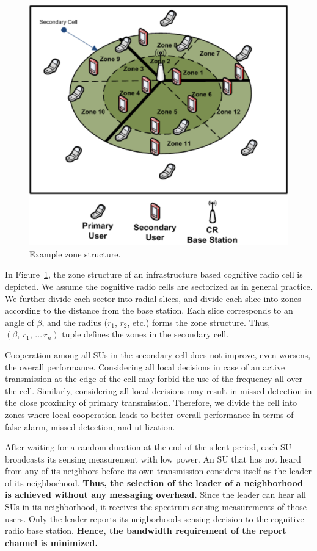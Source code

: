\documentclass[conference,compsoc]{IEEEtran}
\newcommand{\CR}{cognitive radio }
\begin{document}
\begin{figure}[!htb]
\centering
\includegraphics[width=0.99\columnwidth,keepaspectratio] {figs/cellStructure.eps}
\caption{Example zone structure.} \label{fig:zone_structure}
\end{figure}

In Figure~\ref{fig:zone_structure}, the zone structure of an infrastructure based \CR cell is depicted. We assume the \CR cells are sectorized as in general practice. We further divide each sector into radial slices, and divide each slice into zones according to the distance from the base station. Each slice corresponds to an angle of $\beta$, and the radius ($r_1$, $r_2$, etc.) forms the zone structure. Thus, $(\beta, \, r_1, \, ... \, r_n)$ tuple defines the zones in the secondary cell.

Cooperation among all SUs in the secondary cell does not improve, even worsens, the overall performance. Considering all local decisions in case of an active transmission at the edge of the cell may forbid the use of the frequency all over the cell. Similarly, considering all local decisions may result in missed detection in the close proximity of primary transmission. Therefore, we divide the cell into zones where local cooperation leads to better overall performance in terms of false alarm, missed detection, and utilization.

After waiting for a random duration at the end of the silent period, each SU broadcasts its sensing measurement with low power. An SU that has not heard from any of its neighbors before its own transmission considers itself as the leader of its neighborhood. \textbf{Thus, the selection of the leader of a neighborhood is achieved without any messaging overhead.} Since the leader can hear all SUs in its neighborhood, it receives the spectrum sensing measurements of those users. Only the leader reports its neigborhoods sensing decision to the \CR base station. \textbf{Hence, the bandwidth requirement of the report channel is minimized.}
\end{document}
